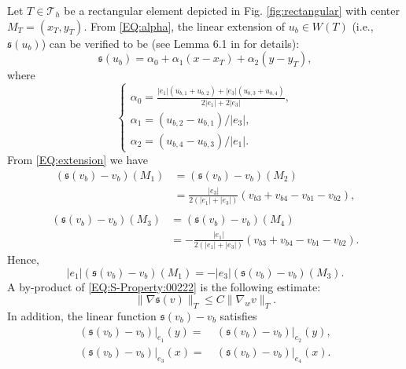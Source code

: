 \documentclass[final,leqno]{siamltex704}
\def\S{{\mathfrak s}}
\def\T{{\mathcal T}}
\begin{document}
Let $T\in\T_h$ be a rectangular element depicted in Fig. \ref{fig:rectangular} with center $M_T=(x_T, y_T)$. From \eqref{EQ:alpha}, the linear extension of $u_b \in W(T)$ (i.e., $\S(u_b)$) can be verified to be (see Lemma 6.1 in \cite{LiDanWW} for details):
\begin{equation}\label{EQ:extension}
\S(u_b)=\alpha_0 + \alpha_1(x-x_T)+\alpha_2(y-y_T),
\end{equation}
where
\begin{equation}\label{EQ:S-Property:00222}
\left\{
\begin{array}{lllll}
\alpha_0 =\displaystyle\frac{|e_1|(u_{b,1} + u_{b,2}) + |e_3|(u_{b,3} +u_{b,4}) }{2|e_1|+2|e_3|},\\
\alpha_1 =(u_{b,2} - u_{b,1})/|e_3|,\\
\alpha_2 =(u_{b,4} - u_{b,3})/|e_1|.
\end{array}
\right.
\end{equation}
From \eqref{EQ:extension} we have
\begin{equation}\label{EQ:S-Property:002}
\begin{split}
({\S}(v_b)-v_b)(M_1) & =({\S}(v_b)-v_b)(M_2)\\
& = \frac{|e_3|}{2(|e_1|+|e_3|)}(v_{b3}+v_{b4}-v_{b1}-v_{b2}),\\
\end{split}
\end{equation}
\begin{equation}\label{EQ:S-Property:008}
\begin{split}
({\S}(v_b)-v_b)(M_3) & =({\S}(v_b)-v_b)(M_4)\\
& =- \frac{|e_1|}{2(|e_1|+|e_3|)}(v_{b3}+v_{b4}-v_{b1}-v_{b2}).
\end{split}
\end{equation}
Hence,
\begin{equation}\label{EQ:S-Property:021}
|e_1|({\S}(v_b)-v_b)(M_1) = - |e_3| ({\S}(v_b)-v_b)(M_3).
\end{equation}
A by-product of \eqref{EQ:S-Property:00222} is the following estimate:
\begin{equation}\label{EQ:S-Property:0212}
\|\nabla \S(v)\|_T \leq C \|\nabla_w v\|_T.
\end{equation}
In addition, the linear function $\S(v_b)-v_b$ satisfies
\begin{equation}\label{EQ:July01:001}
\begin{split}
(\S(v_b)-v_b)|_{e_1}(y) = &\ (\S(v_b)-v_b)|_{e_2}(y),\\
(\S(v_b)-v_b)|_{e_3}(x) = &\ (\S(v_b)-v_b)|_{e_4}(x).
\end{split}
\end{equation}
\end{document}
